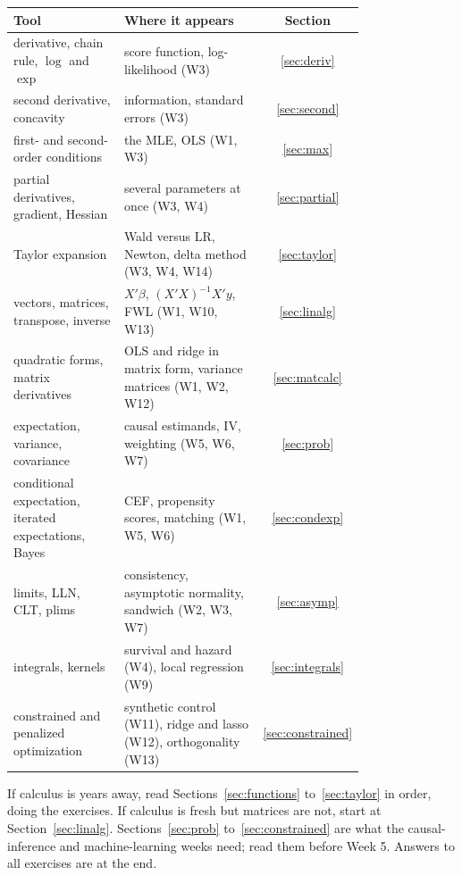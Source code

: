 \documentclass[11pt]{article}
\theoremstyle{definition}
\begin{document}
\begin{center}\small
\renewcommand{\arraystretch}{1.25}
\begin{tabular}{p{0.34\linewidth}p{0.44\linewidth}c}
\toprule
Tool & Where it appears & Section \\
\midrule
derivative, chain rule, $\log$ and $\exp$ & score function, log-likelihood (W3) & \ref{sec:deriv} \\
second derivative, concavity & information, standard errors (W3) & \ref{sec:second} \\
first- and second-order conditions & the MLE, OLS (W1, W3) & \ref{sec:max} \\
partial derivatives, gradient, Hessian & several parameters at once (W3, W4) & \ref{sec:partial} \\
Taylor expansion & Wald versus LR, Newton, delta method (W3, W4, W14) & \ref{sec:taylor} \\
vectors, matrices, transpose, inverse & $X'\beta$, $(X'X)^{-1}X'y$, FWL (W1, W10, W13) & \ref{sec:linalg} \\
quadratic forms, matrix derivatives & OLS and ridge in matrix form, variance matrices (W1, W2, W12) & \ref{sec:matcalc} \\
expectation, variance, covariance & causal estimands, IV, weighting (W5, W6, W7) & \ref{sec:prob} \\
conditional expectation, iterated expectations, Bayes & CEF, propensity scores, matching (W1, W5, W6) & \ref{sec:condexp} \\
limits, LLN, CLT, plims & consistency, asymptotic normality, sandwich (W2, W3, W7) & \ref{sec:asymp} \\
integrals, kernels & survival and hazard (W4), local regression (W9) & \ref{sec:integrals} \\
constrained and penalized optimization & synthetic control (W11), ridge and lasso (W12), orthogonality (W13) & \ref{sec:constrained} \\
\bottomrule
\end{tabular}
\end{center}

If calculus is years away, read Sections~\ref{sec:functions}
to~\ref{sec:taylor} in order, doing the exercises. If calculus is fresh but
matrices are not, start at Section~\ref{sec:linalg}. Sections~\ref{sec:prob}
to~\ref{sec:constrained} are what the causal-inference and machine-learning
weeks need; read them before Week 5. Answers to all exercises are at the end.

\end{document}
